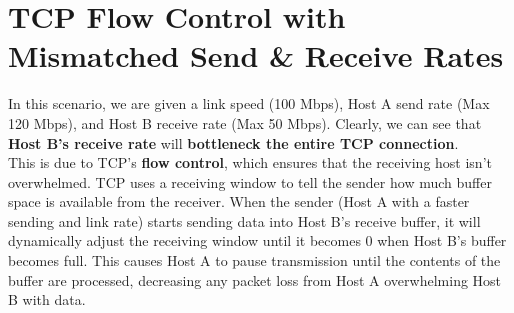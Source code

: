 \documentclass[colorlinks=true, allcolors=blue]{article}
\begin{document}

\section{TCP Flow Control with Mismatched Send \& Receive Rates}
In this scenario, we are given a link speed (100 Mbps), Host A send rate (Max 120 Mbps), and Host B receive rate (Max 50 Mbps). Clearly, we can see that \textbf{Host B's receive rate} will \textbf{bottleneck the entire TCP connection}. \\
This is due to TCP's \textbf{flow control}, which ensures that the receiving host isn't overwhelmed. TCP uses a receiving window to tell the sender how much buffer space is available from the receiver. When the sender (Host A with a faster sending and link rate) starts sending data into Host B's receive buffer, it will dynamically adjust the receiving window until it becomes 0 when Host B's buffer becomes full. This causes Host A to pause transmission until the contents of the buffer are processed, decreasing any packet loss from Host A overwhelming Host B with data.
\end{document}
